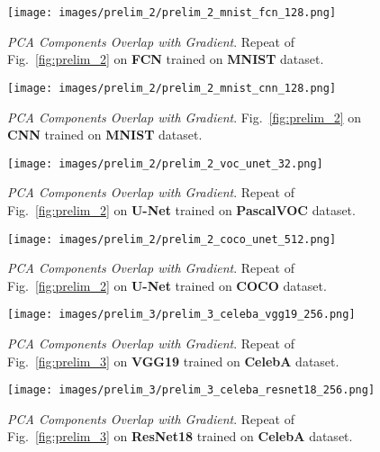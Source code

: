 \begin{figure}[h!]
  \centering
  \centerline{\texttt{[image: images/prelim\_2/prelim\_2\_mnist\_fcn\_128.png]}}
  \caption{\small{\textit{PCA Components Overlap with Gradient}. Repeat of Fig.~\ref{fig:prelim_2} on \textbf{FCN} trained on \textbf{MNIST} dataset.}}
  \label{fig:prelim_2_mnist_fcn}
\end{figure}

\begin{figure}[h!]
  \centering
  \centerline{\texttt{[image: images/prelim\_2/prelim\_2\_mnist\_cnn\_128.png]}}
  \caption{\small{\textit{PCA Components Overlap with Gradient}. Fig.~\ref{fig:prelim_2} on \textbf{CNN} trained on \textbf{MNIST} dataset.}}
  \label{fig:prelim_2_mnist_cnn}
\end{figure}

\clearpage

\begin{figure}[h!]
  \centering
  \centerline{\texttt{[image: images/prelim\_2/prelim\_2\_voc\_unet\_32.png]}}
  \caption{\small{\textit{PCA Components Overlap with Gradient}. Repeat of Fig.~\ref{fig:prelim_2} on \textbf{U-Net} trained on \textbf{PascalVOC} dataset.}}
  \label{fig:prelim_2_voc_unet}
\end{figure}

\begin{figure}[h!]
  \centering
  \centerline{\texttt{[image: images/prelim\_2/prelim\_2\_coco\_unet\_512.png]}}
  \caption{\small{\textit{PCA Components Overlap with Gradient}. Repeat of Fig.~\ref{fig:prelim_2} on \textbf{U-Net} trained on \textbf{COCO} dataset.}}
  \label{fig:prelim_2_coco_unet}
\end{figure}

\newpage

\begin{figure}[h!]
  \centering
  \centerline{\texttt{[image: images/prelim\_3/prelim\_3\_celeba\_vgg19\_256.png]}}
  \caption{\small{\textit{PCA Components Overlap with Gradient}. Repeat of Fig.~\ref{fig:prelim_3} on \textbf{VGG19} trained on \textbf{CelebA} dataset.}}
  \label{fig:prelim_3_celeba_vgg19}
\end{figure}

\begin{figure}[h!]
  \centering
  \centerline{\texttt{[image: images/prelim\_3/prelim\_3\_celeba\_resnet18\_256.png]}}
  \caption{\small{\textit{PCA Components Overlap with Gradient}. Repeat of Fig.~\ref{fig:prelim_3} on \textbf{ResNet18} trained on \textbf{CelebA} dataset.}}
  \label{fig:prelim_3_celeba_resnet18}
\end{figure}

